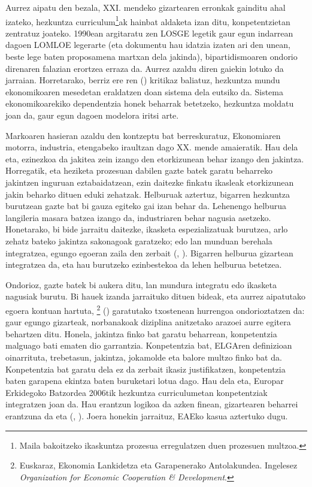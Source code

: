 Aurrez aipatu den bezala, XXI. mendeko gizartearen erronkak gainditu ahal izateko, hezkuntza curriculum\footnote{Maila bakoitzeko ikaskuntza prozesua erregulatzen duen prozesuen multzoa.}ak hainbat aldaketa izan ditu, konpetentzietan zentratuz joateko. 1990ean argitaratu zen LOSGE legetik gaur egun indarrean dagoen LOMLOE legerarte (eta dokumentu hau idatzia izaten ari den unean, beste lege baten proposamena martxan dela jakinda), bipartidismoaren ondorio direnaren falazian erortzea erraza da. Aurrez azaldu diren gaiekin lotuko da jarraian. Horretarako, berriz ere \citeauthor{sole2020cambio}ren (\citeyear{sole2020cambio}) kritikaz baliatuz, hezkuntza mundu ekonomikoaren mesedetan eraldatzen doan sistema dela eutsiko da. Sistema ekonomikoarekiko dependentzia honek beharrak betetzeko, hezkuntza moldatu joan da, gaur egun dagoen modelora iritsi arte.

Markoaren hasieran azaldu den kontzeptu bat berreskuratuz, Ekonomiaren motorra, industria, etengabeko iraultzan dago XX. mende amaieratik. Hau dela eta, ezinezkoa da jakitea zein izango den etorkizunean behar izango den jakintza. Horregatik, eta heziketa prozesuan dabilen gazte batek garatu beharreko jakintzen inguruan eztabaidatzean, ezin daitezke finkatu ikasleak etorkizunean jakin beharko dituen eduki zehatzak. Helburuak aztertuz, bigarren hezkuntza burutzean gazte bat bi gauza egiteko gai izan behar da. Lehenengo helburua langileria masara batzea izango da, industriaren behar nagusia asetzeko. Honetarako, bi bide jarraitu daitezke, ikasketa espezializatuak burutzea, arlo zehatz bateko jakintza sakonagoak garatzeko; edo lan munduan berehala integratzea, egungo egoeran zaila den zerbait (\citeauthor{fernandez2016adquisicion}, \citeyear{fernandez2016adquisicion}). Bigarren helburua gizartean integratzea da, eta hau burutzeko ezinbestekoa da lehen helburua betetzea.

Ondorioz, gazte batek bi aukera ditu, lan mundura integratu edo ikasketa nagusiak burutu. Bi hauek izanda jarraituko dituen bideak, eta aurrez aipatutako egoera kontuan hartuta, \citeauthor{ocde2005deseco}\footnote{Euskaraz, Ekonomia Lankidetza eta Garapenerako Antolakundea. Ingelesez \textit{Organization for Economic Cooperation \& Development}.} (\citeyear{ocde2005deseco}) garatutako txostenean hurrengoa ondorioztatzen da: gaur egungo gizarteak, norbanakoak diziplina anitzetako arazoei aurre egitera behartzen ditu. Honela, jakintza finko bat garatu beharrean, konpetentzia malguago bati ematen dio garrantzia. Konpetentzia bat, ELGAren definizioan oinarrituta, trebetasun, jakintza, jokamolde eta balore multzo finko bat da. Konpetentzia bat garatu dela ez da zerbait ikasiz justifikatzen, konpetentzia baten garapena ekintza baten buruketari lotua dago. Hau dela eta, Europar Erkidegoko Batzordea 2006tik hezkuntza curriculumetan konpetentziak integratzen joan da. Hau erantzun logikoa da azken finean, gizartearen beharrei erantzuna da eta (\citeauthor{valle2013competencias}, \citeyear{valle2013competencias}). Joera honekin jarraituz, EAEko kasua aztertuko dugu.

